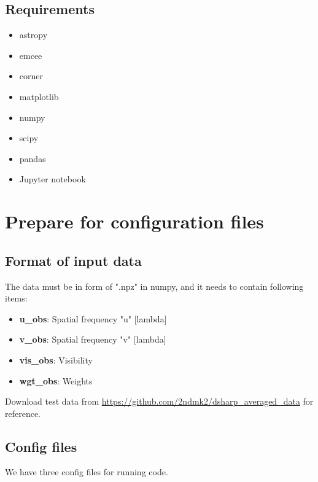 \documentclass{report}
\begin{document}
\section{Requirements }
\begin{itemize}
    \item astropy
    \item emcee
    \item corner
    \item matplotlib
    \item numpy
    \item scipy
    \item pandas
    \item Jupyter notebook
\end{itemize}


\chapter{Prepare for configuration files \label{sec:prep_sec}}

\section{Format of input data \label{sec:format_data}}
The data must be in form of ".npz" in numpy, and it needs to contain following items: 
\begin{itemize}
    \item \textbf{u\_obs}: Spatial frequency "u" [lambda]
    \item \textbf{v\_obs}: Spatial frequency "v" [lambda]
    \item \textbf{vis\_obs}: Visibility 
    \item \textbf{wgt\_obs}: Weights 
\end{itemize}
Download test data from \url{https://github.com/2ndmk2/dsharp_averaged_data} for reference. 


\section{Config files}
We have three config files for running code. 
\end{document}
